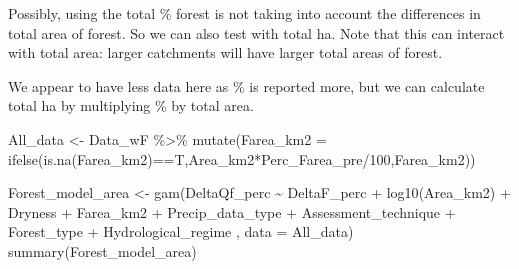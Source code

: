 \documentclass[]{elsarticle} %
\newenvironment{Shaded}{\begin{snugshade}}{\end{snugshade}}
\newcommand{\AttributeTok}[1]{\textcolor[rgb]{0.77,0.63,0.00}{#1}}
\newcommand{\DecValTok}[1]{\textcolor[rgb]{0.00,0.00,0.81}{#1}}
\newcommand{\FunctionTok}[1]{\textcolor[rgb]{0.00,0.00,0.00}{#1}}
\newcommand{\NormalTok}[1]{#1}
\newcommand{\OtherTok}[1]{\textcolor[rgb]{0.56,0.35,0.01}{#1}}
\newcommand{\SpecialCharTok}[1]{\textcolor[rgb]{0.00,0.00,0.00}{#1}}
\begin{document}
Possibly, using the total \% forest is not taking into account the differences in total area of forest. So we can also test with total ha. Note that this can interact with total area: larger catchments will have larger total areas of forest.

We appear to have less data here as \% is reported more, but we can calculate total ha by multiplying \% by total area.

\begin{Shaded}
\begin{Highlighting}[]
\NormalTok{All\_data }\OtherTok{\textless{}{-}}\NormalTok{ Data\_wF }\SpecialCharTok{\%\textgreater{}\%}
  \FunctionTok{mutate}\NormalTok{(}\AttributeTok{Farea\_km2 =} \FunctionTok{ifelse}\NormalTok{(}\FunctionTok{is.na}\NormalTok{(Farea\_km2)}\SpecialCharTok{==}\NormalTok{T,Area\_km2}\SpecialCharTok{*}\NormalTok{Perc\_Farea\_pre}\SpecialCharTok{/}\DecValTok{100}\NormalTok{,Farea\_km2))}

\NormalTok{Forest\_model\_area }\OtherTok{\textless{}{-}} \FunctionTok{gam}\NormalTok{(DeltaQf\_perc }\SpecialCharTok{\textasciitilde{}}\NormalTok{ DeltaF\_perc }\SpecialCharTok{+} 
                    \FunctionTok{log10}\NormalTok{(Area\_km2) }\SpecialCharTok{+} 
\NormalTok{                    Dryness }\SpecialCharTok{+} 
\NormalTok{                    Farea\_km2 }\SpecialCharTok{+}
\NormalTok{                    Precip\_data\_type }\SpecialCharTok{+}\NormalTok{  Assessment\_technique }\SpecialCharTok{+}
\NormalTok{                    Forest\_type }\SpecialCharTok{+}
\NormalTok{                    Hydrological\_regime}
\NormalTok{                    , }\AttributeTok{data =}\NormalTok{ All\_data)}
\FunctionTok{summary}\NormalTok{(Forest\_model\_area)}
\end{Highlighting}
\end{Shaded}
\end{document}
